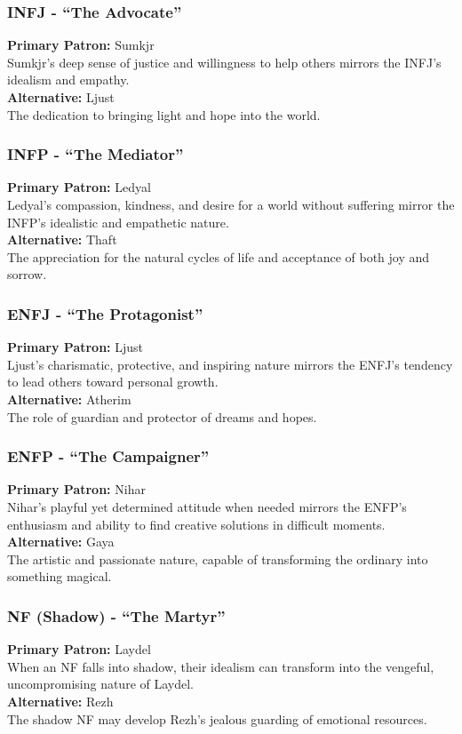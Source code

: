 \documentclass[a4paper,twoside,openany]{book}
\begin{document}
\begin{multicols}{2}
	\subsubsection*{INFJ - ``The Advocate''}
	\textbf{Primary Patron:} Sumkjr\\
	Sumkjr's deep sense of justice and willingness to help others mirrors the INFJ's idealism and empathy.\\
	\textbf{Alternative:} Ljust\\
	The dedication to bringing light and hope into the world.

	\subsubsection*{INFP - ``The Mediator''}
	\textbf{Primary Patron:} Ledyal\\
	Ledyal's compassion, kindness, and desire for a world without suffering mirror the INFP's idealistic and empathetic nature.\\
	\textbf{Alternative:} Thaft\\
	The appreciation for the natural cycles of life and acceptance of both joy and sorrow.

	\subsubsection*{ENFJ - ``The Protagonist''}
	\textbf{Primary Patron:} Ljust\\
	Ljust's charismatic, protective, and inspiring nature mirrors the ENFJ's tendency to lead others toward personal growth.\\
	\textbf{Alternative:} Atherim\\
	The role of guardian and protector of dreams and hopes.

	\subsubsection*{ENFP - ``The Campaigner''}
	\textbf{Primary Patron:} Nihar\\
	Nihar's playful yet determined attitude when needed mirrors the ENFP's enthusiasm and ability to find creative solutions in difficult moments.\\
	\textbf{Alternative:} Gaya\\
	The artistic and passionate nature, capable of transforming the ordinary into something magical.

	\subsubsection*{NF (Shadow) - ``The Martyr''}
	\textbf{Primary Patron:} Laydel\\
	When an NF falls into shadow, their idealism can transform into the vengeful, uncompromising nature of Laydel.\\
	\textbf{Alternative:} Rezh\\
	The shadow NF may develop Rezh's jealous guarding of emotional resources.


\end{multicols}
\end{document}
